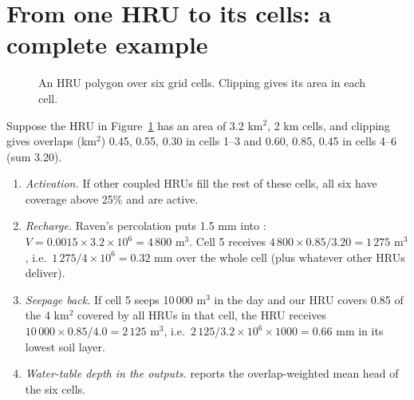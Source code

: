 \section{From one HRU to its cells: a complete example}
\begin{figure}[!htbp]\centering
{}
\caption{An HRU polygon over six grid cells. Clipping gives its area in each cell.}\label{fig:hrucells}
\end{figure}
\begin{example}
Suppose the HRU in Figure~\ref{fig:hrucells} has an  area of 3.2 km$^2$, 2 km cells, and clipping gives overlaps (km$^2$)
0.45, 0.55, 0.30 in cells 1--3 and 0.60, 0.85, 0.45 in cells 4--6 (sum 3.20).
\begin{enumerate}
\item \emph{Activation.} If other coupled HRUs fill the rest of these cells, all six have coverage above 25\% and are active.
\item \emph{Recharge.} Raven's percolation puts 1.5 mm into : $V=0.0015\times3.2\times10^6=4\,800$ m$^3$.
Cell 5 receives $4\,800\times0.85/3.20=1\,275$ m$^3$, i.e.\ $1\,275/4\times10^6=0.32$ mm over the whole cell (plus whatever other
HRUs deliver).
\item \emph{Seepage back.} If cell 5 seeps 10\,000 m$^3$ in the day and our HRU covers 0.85 of the 4 km$^2$ covered by all
HRUs in that cell, the HRU receives $10\,000\times0.85/4.0=2\,125$ m$^3$, i.e.\ $2\,125/3.2\times10^6\times1000=0.66$ mm in its lowest soil layer.
\item \emph{Water-table depth in the outputs.}  reports the overlap-weighted mean head of the six cells.
\end{enumerate}
\end{example}

